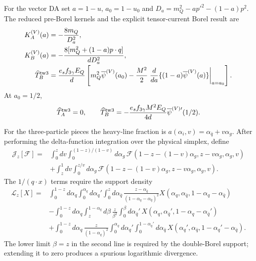 \documentclass[11pt]{article}
\begin{document}
For the vector DA set $a=1-u$, $a_0=1-u_0$ and
$D_a=m_Q^2-ap'^2-(1-a)p^2$.  The reduced pre-Borel kernels and the explicit
tensor-current Borel result are
\begin{align}
 K_A^{(V)}(a)&=-\frac{8m_Q}{D_a^2},\nonumber\\
 K_B^{(V)}(a)&=-\frac{8[m_Q^2+(1-a)p\cdot q]}{dD_a^2},
 \nonumber\\[-2pt]
 \widehat T_B^{\rm tw3}
 &=\frac{e_sf_{3\gamma}E_Q}{d}
 \left[
 m_Q^2\overline\psi^{(V)}(a_0)
 -\frac{M^2}{2}
 \left.\frac{d}{da}
 \{(1-a)\overline\psi^{(V)}(a)\}\right|_{a=a_0}
 \right].
 \label{eq:app-tensor-tw3-explicit}
\end{align}
At $a_0=1/2$,
\begin{equation}
 \widehat T_A^{\rm tw3}=0,\qquad
 \widehat T_B^{\rm tw3}
 =-\frac{e_sf_{3\gamma}M^2E_Q}{4d}
 \overline\psi^{(V)\prime}(1/2).
 \label{eq:app-symmetric-tw3}
\end{equation}

For the three-particle pieces the heavy-line fraction is
$a(\alpha_i,v)=\alpha_{\bar q}+v\alpha_g$.  After performing the
delta-function integration over the physical simplex, define
\begin{align}
 \mathcal J_z[\mathcal F]={}&
 \int_0^z dv\int_0^{(1-z)/(1-v)}d\alpha_g\,
 \mathcal F(1-z-(1-v)\alpha_g,z-v\alpha_g,\alpha_g,v)
 \nonumber\\
 &+\int_z^1dv\int_0^{z/v}d\alpha_g\,
 \mathcal F(1-z-(1-v)\alpha_g,z-v\alpha_g,\alpha_g,v).
 \label{eq:app-line-projection}
\end{align}
The $1/(q\cdot x)$ terms require the support density
\begin{align}
 \mathcal L_z[X]={}&
 \int_0^{1-z}d\alpha_q\int_0^{\alpha_q}d\alpha_q'
 \int_0^z d\alpha_{\bar q}\,
 \frac{z-\alpha_{\bar q}}{(1-\alpha_q-\alpha_{\bar q})^2}
 X(\alpha_q,\alpha_{\bar q},1-\alpha_q-\alpha_{\bar q})
 \nonumber\\
 &-\int_0^{1-z}d\alpha_q\int_z^{1-\alpha_q}d\beta\,
 \frac{z}{\beta^2}\int_0^\beta d\alpha_{\bar q}'\,
 X(\alpha_q,\alpha_{\bar q}',1-\alpha_q-\alpha_{\bar q}')
 \nonumber\\
 &+\int_0^{1-z}d\alpha_q\,\frac{z}{(1-\alpha_q)^2}
 \int_0^{\alpha_q}d\alpha_q'
 \int_0^{1-\alpha_q'}d\alpha_{\bar q}\,
 X(\alpha_q',\alpha_{\bar q},1-\alpha_q'-\alpha_{\bar q}).
 \label{eq:app-P-line-density}
\end{align}
The lower limit $\beta=z$ in the second line is required by the double-Borel
support; extending it to zero produces a spurious logarithmic divergence.
\end{document}
